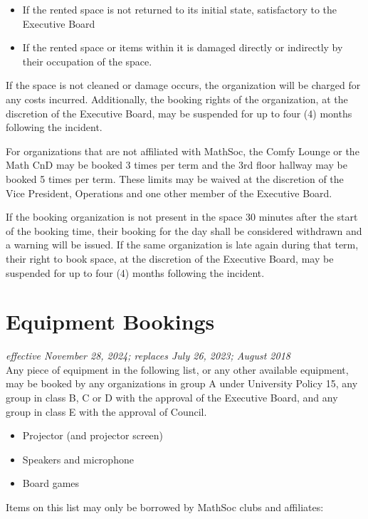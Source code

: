 \begin{itemize}
	\item If the rented space is not returned to its initial state, satisfactory to the Executive Board
	\item If the rented space or items within it is damaged directly or indirectly by their occupation
	      of the space.
\end{itemize}

If the space is not cleaned or damage occurs, the organization will be charged for any costs
incurred.
Additionally, the booking rights of the organization, at the discretion of the Executive Board,
may be suspended for up to four (4) months following the incident. 

For organizations that are not affiliated with MathSoc, the Comfy Lounge or the Math CnD may be 
booked 3 times per term and the 3rd floor hallway may be booked 5 times per term. These limits may 
be waived at the discretion of the Vice President, Operations and one other member of the Executive Board. 

If the booking organization is not present in the space 30 minutes after the start of the booking time, 
their booking for the day shall be considered withdrawn and a warning will be issued. If the same 
organization is late again during that term, their right to book space, at the discretion of the Executive 
Board, may be suspended for up to four (4) months following the incident.

\section{Equipment Bookings}
\emph{effective November 28, 2024; replaces July 26, 2023; August 2018}\\

Any piece of equipment in the following list, or any other available equipment,
may be booked by any organizations in group A under University Policy 15, any
group in class B, C or D with the approval of the Executive Board, and any
group in class E with the approval of Council.

\begin{itemize}
	\item Projector (and projector screen)
	\item Speakers and microphone
	\item Board games
\end{itemize}

Items on this list may only be borrowed by MathSoc clubs and affiliates:

